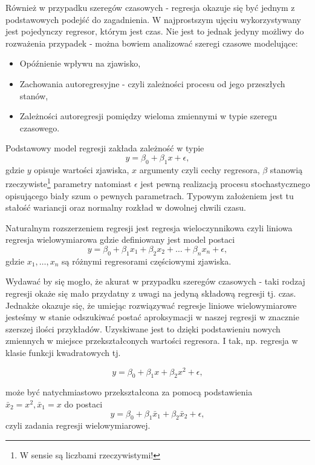 \documentclass[10pt,a4paper]{book}
\begin{document}
Również w przypadku szeregów czasowych - regresja okazuje się być jednym z podstawowych podejść do zagadnienia. W najprostszym ujęciu wykorzystywany jest pojedynczy regresor, którym jest czas. Nie jest to jednak jedyny możliwy do rozważenia przypadek - można bowiem analizować szeregi czasowe modelujące:
\begin{itemize}
\item Opóźnienie wpływu na zjawisko,
\item Zachowania autoregresyjne - czyli zależności procesu od jego przeszłych stanów,
\item Zależności autoregresji pomiędzy wieloma zmiennymi w typie szeregu czasowego.
\end{itemize}

Podstawowy model regresji zakłada zależność w typie
\begin{equation}
y = \beta_0 + \beta_1 x + \epsilon,
\end{equation}
gdzie $y$ opisuje wartości zjawiska, $x$ argumenty czyli cechy regresora, $\beta$ stanowią rzeczywiste\footnote{W sensie są liczbami rzeczywistymi!} parametry natomiast $\epsilon$ jest pewną realizacją procesu stochastycznego opisującego biały szum o pewnych parametrach. Typowym założeniem jest tu stałość wariancji oraz normalny rozkład w dowolnej chwili czasu.  

Naturalnym rozszerzeniem regresji jest regresja wieloczynnikowa czyli liniowa regresja wielowymiarowa gdzie definiowany jest model postaci
\begin{equation}
y = \beta_0 + \beta_1 x_1 + \beta_2 x_2 + \ldots + \beta_n x_n + \epsilon,
\end{equation}
gdzie $x_1,\dots,x_n$ są różnymi regresorami częściowymi zjawiska. 

Wydawać by się mogło, że akurat w przypadku szeregów czasowych - taki rodzaj regresji okaże się mało przydatny z uwagi na jedyną składową regresji tj. czas. Jednakże okazuje się, że umiejąc rozwiązywać regresje liniowe wielowymiarowe jesteśmy w stanie odszukiwać postać aproksymacji w naszej regresji w znacznie szerszej ilości przykładów. Uzyskiwane jest to dzięki podstawieniu nowych zmiennych w miejsce przekształconych wartości regresora. I tak, np. regresja w klasie funkcji kwadratowych tj.

\begin{equation}
y = \beta_0 + \beta_1 x + \beta_2 x^2 + \epsilon,
\end{equation}

może być natychmiastowo przekształcona za pomocą podstawienia $\bar{x}_2 = x^2, \bar{x}_1 = x$ do postaci
$$
y = \beta_0 + \beta_1 \bar{x}_1 + \beta_2 \bar{x}_2 + \epsilon,
$$
czyli zadania regresji wielowymiarowej. 
\end{document}
